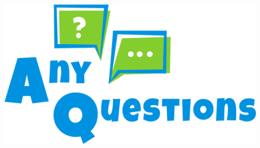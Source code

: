 \documentclass[pdflatex,compress]{beamer}
\begin{document}
\begin{frame}
	\begin{center}
		\includegraphics[width=1\linewidth]{../../img/any_questions}
	\end{center}
\end{frame}
\end{document}
